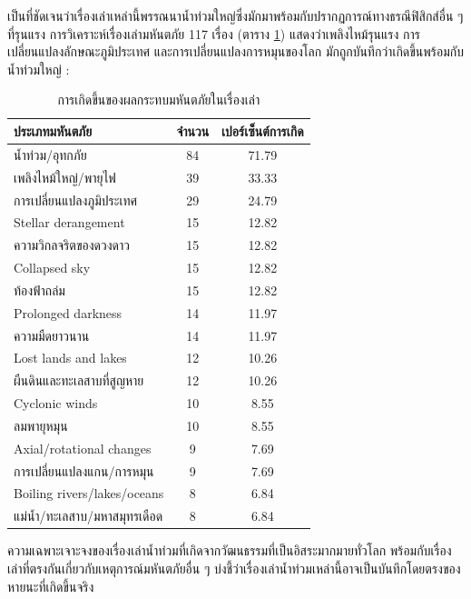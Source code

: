 \documentclass[10pt,twocolumn,letterpaper]{article}
\begin{document}
เป็นที่ชัดเจนว่าเรื่องเล่าเหล่านี้พรรณนาน้ำท่วมใหญ่ซึ่งมักมาพร้อมกับปรากฏการณ์ทางธรณีฟิสิกส์อื่น ๆ ที่รุนแรง การวิเคราะห์เรื่องเล่ามหันตภัย 117 เรื่อง (ตาราง \ref{tab: 1}) แสดงว่าเพลิงไหม้รุนแรง การเปลี่ยนแปลงลักษณะภูมิประเทศ และการเปลี่ยนแปลงการหมุนของโลก มักถูกบันทึกว่าเกิดขึ้นพร้อมกับน้ำท่วมใหญ่ \cite{14}:

\begin{table}[ht]
\begin{center}
\renewcommand{\arraystretch}{1.2}  %
\begin{tabular}{|l|c|c|}
\hline
\textbf{ประเภทมหันตภัย} & \textbf{จำนวน} & \textbf{เปอร์เซ็นต์การเกิด} \\
\hline\hline
น้ำท่วม/อุทกภัย            & 84 & 71.79 \\
เพลิงไหม้ใหญ่/พายุไฟ       & 39 & 33.33 \\
การเปลี่ยนแปลงภูมิประเทศ   & 29 & 24.79 \\

Stellar derangement     & 15 & 12.82 \\
ความวิกลจริตของดวงดาว     & 15 & 12.82 \\
Collapsed sky           & 15 & 12.82 \\
ท้องฟ้าถล่ม              & 15 & 12.82 \\
Prolonged darkness      & 14 & 11.97 \\
ความมืดยาวนาน           & 14 & 11.97 \\
Lost lands and lakes    & 12 & 10.26 \\
ผืนดินและทะเลสาบที่สูญหาย  & 12 & 10.26 \\
Cyclonic winds          & 10 & 8.55  \\
ลมพายุหมุน              & 10 & 8.55  \\
Axial/rotational changes & 9 & 7.69  \\
การเปลี่ยนแปลงแกน/การหมุน & 9 & 7.69  \\
Boiling rivers/lakes/oceans & 8 & 6.84 \\
แม่น้ำ/ทะเลสาบ/มหาสมุทรเดือด & 8 & 6.84 \\
\hline
\end{tabular}
\end{center}
\caption{การเกิดขึ้นของผลกระทบมหันตภัยในเรื่องเล่า}
\label{tab: 1}
\end{table}

ความเฉพาะเจาะจงของเรื่องเล่าน้ำท่วมที่เกิดจากวัฒนธรรมที่เป็นอิสระมากมายทั่วโลก พร้อมกับเรื่องเล่าที่ตรงกันเกี่ยวกับเหตุการณ์มหันตภัยอื่น ๆ บ่งชี้ว่าเรื่องเล่าน้ำท่วมเหล่านี้อาจเป็นบันทึกโดยตรงของหายนะที่เกิดขึ้นจริง
\end{document}
